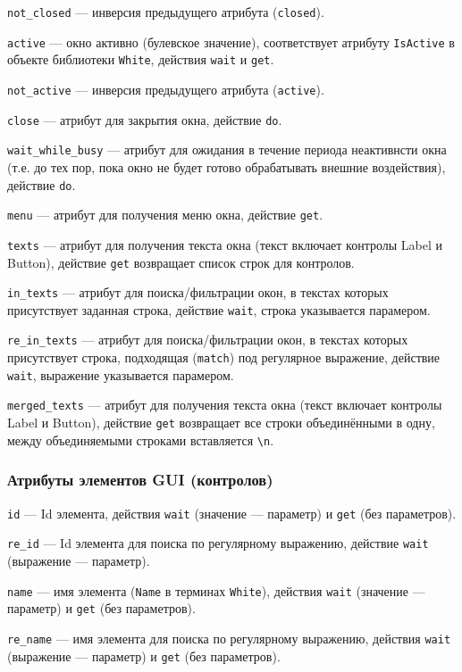\documentclass[11pt]{book} %
\begin{document}
\verb'not_closed' --- инверсия предыдущего атрибута (\verb|closed|).

\verb'active' --- окно активно (булевское значение), соответствует атрибуту \verb|IsActive| в объекте библиотеки \verb|White|, действия \verb|wait| и \verb|get|.

\verb'not_active' --- инверсия предыдущего атрибута (\verb|active|).

\verb'close' --- атрибут для закрытия окна, действие \verb|do|.

\verb'wait_while_busy' --- атрибут для ожидания в течение периода неактивнсти окна (т.е. до тех пор, пока окно не будет готово обрабатывать внешние воздействия), действие \verb|do|.

\verb|menu| --- атрибут для получения меню окна, действие \verb|get|.


\verb'texts' --- атрибут для получения текста окна (текст включает контролы Label и Button), действие \verb|get| возвращает список строк для контролов.


\verb'in_texts' --- атрибут для поиска/фильтрации окон, в текстах которых присутствует заданная строка, действие \verb|wait|, строка указывается парамером.
 
\verb're_in_texts' --- атрибут для поиска/фильтрации окон, в текстах которых присутствует строка, подходящая (\verb|match|) под регулярное выражение, действие \verb|wait|, выражение указывается парамером.

\verb'merged_texts' --- атрибут для получения текста окна (текст включает контролы Label и Button), действие \verb|get| возвращает все строки объединёнными в одну, между объединяемыми строками вставляется \verb'\n'.


\subsubsection{Атрибуты элементов GUI (контролов)}


\verb'id' --- Id элемента, действия \verb|wait| (значение --- параметр) и \verb|get| (без параметров).

\verb're_id' --- Id элемента для поиска по регулярному выражению, действие \verb|wait| (выражение --- параметр).

\verb'name' --- имя элемента (\verb|Name| в терминах \verb|White|), действия \verb|wait| (значение --- параметр) и \verb|get| (без параметров).

\verb're_name' --- имя элемента для поиска по регулярному выражению, действия \verb|wait| (выражение --- параметр) и \verb|get| (без параметров).
\end{document}
